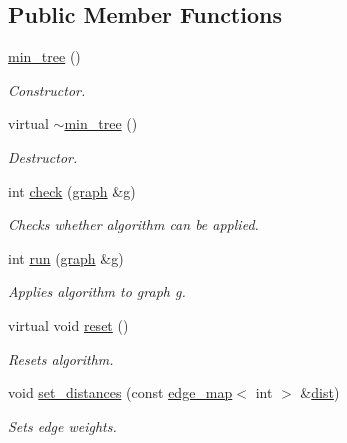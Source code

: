 \subsection*{Public Member Functions}
\begin{DoxyCompactItemize}
\item 
\mbox{\hyperlink{classmin__tree_aea5bc677c18e5a02ea9d1694ba6ba213}{min\+\_\+tree}} ()
\begin{DoxyCompactList}\small\item\em Constructor. \end{DoxyCompactList}\item 
virtual \mbox{\hyperlink{classmin__tree_a0df992f77a8656121777aa2c0380a67a}{$\sim$min\+\_\+tree}} ()
\begin{DoxyCompactList}\small\item\em Destructor. \end{DoxyCompactList}\item 
int \mbox{\hyperlink{classmin__tree_ad87b1bfbc687ad943c07538fa0c3d270}{check}} (\mbox{\hyperlink{classgraph}{graph}} \&\mbox{\hyperlink{rings_8cpp_aa9df5aa3976a89a96a5f1c7611d42938}{g}})
\begin{DoxyCompactList}\small\item\em Checks whether algorithm can be applied. \end{DoxyCompactList}\item 
int \mbox{\hyperlink{classmin__tree_ac025e8dad0db7a6a1e0e7b476b547802}{run}} (\mbox{\hyperlink{classgraph}{graph}} \&\mbox{\hyperlink{rings_8cpp_aa9df5aa3976a89a96a5f1c7611d42938}{g}})
\begin{DoxyCompactList}\small\item\em Applies algorithm to graph g. \end{DoxyCompactList}\item 
virtual void \mbox{\hyperlink{classmin__tree_a0edbe612424dc5f4de4701b8fd0df931}{reset}} ()
\begin{DoxyCompactList}\small\item\em Resets algorithm. \end{DoxyCompactList}\item 
void \mbox{\hyperlink{classmin__tree_a0f3eb1714b7859576037cf4b991b16cb}{set\+\_\+distances}} (const \mbox{\hyperlink{classedge__map}{edge\+\_\+map}}$<$ int $>$ \&\mbox{\hyperlink{classmin__tree_ae612767aa8e3eb3bedd1dadd7c68f99c}{dist}})
\begin{DoxyCompactList}\small\item\em Sets edge weights. \end{DoxyCompactList}\item 

\end{DoxyCompactItemize}
